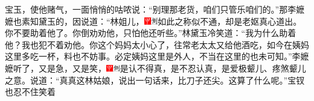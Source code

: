 宝玉，使他赌气，一面悄悄的咕哝说：“别理那老货，咱们只管乐咱们的。”那李嬷嬷也素知黛玉的，因说道：“林姐儿，{\includegraphics[width=3mm]{../Images/00002}\includegraphics[width=3mm]{../Images/00011}\footnotesize \kaishu 如此之称似不通，却是老妪真心道出。}你不要助着他了。你倒劝劝他，只怕他还听些。”林黛玉冷笑道：“我为什么助着他？我也犯不着劝他。你这个妈妈太小心了，往常老太太又给他酒吃，如今在姨妈这里多吃一杯，料也不妨事。必定姨妈这里是外人，不当在这里的也未可知。”李嬷嬷听了，又是急，又是笑，{\includegraphics[width=3mm]{../Images/00002}\includegraphics[width=3mm]{../Images/00011}\footnotesize \kaishu 是认不得真，是不忍认真，是爱极颦儿、疼煞颦儿之意。}说道：“真真这林姑娘，说出一句话来，比刀子还尖。这算了什么呢。”宝钗也忍不住笑着